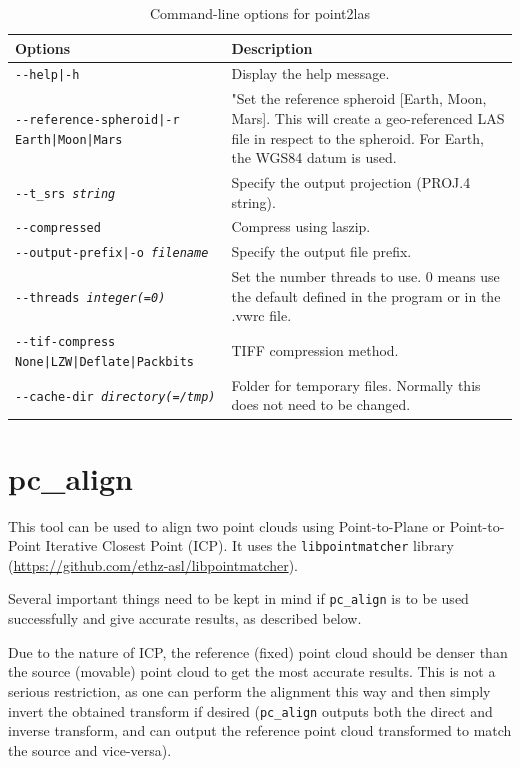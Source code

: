 \begin{longtable}{|l|p{10cm}|}
\caption{Command-line options for point2las}
\label{tbl:point2las}
\endfirsthead
\endhead
\endfoot
\endlastfoot
\hline
Options & Description \\ \hline \hline
\texttt{-\/-help|-h} & Display the help message.\\ \hline
\texttt{-\/-reference-spheroid|-r Earth|Moon|Mars} & "Set the reference spheroid [Earth, Moon, Mars]. This will create a geo-referenced LAS file in respect to the spheroid. For Earth, the WGS84 datum is used. \\ \hline
\texttt{-\/-t\_srs \textit{string}} & Specify the output projection (PROJ.4 string). \\ \hline
\texttt{-\/-compressed} &
Compress using laszip. \\ \hline
\texttt{-\/-output-prefix|-o \textit{filename}} & Specify the output file prefix. \\ \hline
\texttt{-\/-threads \textit{integer(=0)}} & Set the number threads to use. 0 means use the default defined in the program or in the .vwrc file.\\ \hline
\texttt{-\/-tif-compress None|LZW|Deflate|Packbits} & TIFF compression method.\\ \hline
\texttt{-\/-cache-dir \textit{directory(=/tmp)}} & Folder for temporary files. Normally this does not need to be changed.\\ \hline
\end{longtable}

\section{pc\_align}
\label{pcalign}

This tool can be used to align two point clouds using Point-to-Plane or
Point-to-Point Iterative Closest Point (ICP). It uses the
\texttt{libpointmatcher} library~\cite{Pomerleau12comp}
(\url{https://github.com/ethz-asl/libpointmatcher}).

Several important things need to be kept in mind if \texttt{pc\_align} is to be
used successfully and give accurate results, as described below.

Due to the nature of ICP, the reference (fixed) point cloud should be
denser than the source (movable) point cloud to get the most accurate
results. This is not a serious restriction, as one can perform the
alignment this way and then simply invert the obtained transform if
desired (\texttt{pc\_align} outputs both the direct and inverse
transform, and can output the reference point cloud transformed to match
the source and vice-versa).

